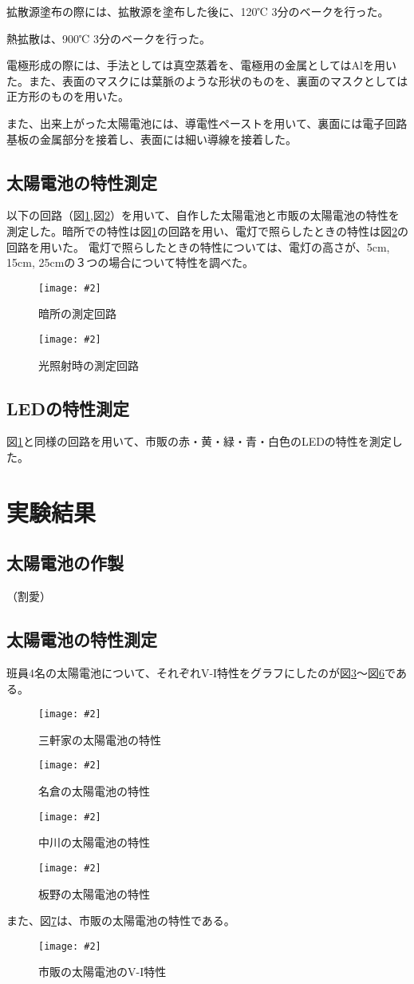 \documentclass[11pt]{ltjsarticle}
\newcommand{\fg}[3]{
	\begin{figure}
		\texttt{[image: \#2]}
		\caption{#3}
		\label{#1}
	\end{figure}
}
\newcommand{\fr}[1]{図\ref{#1}}
\begin{document}
		拡散源塗布の際には、拡散源を塗布した後に、120℃ 3分のベークを行った。
		
		熱拡散は、900℃ 3分のベークを行った。
		
		電極形成の際には、手法としては真空蒸着を、電極用の金属としてはAlを用いた。また、表面のマスクには葉脈のような形状のものを、裏面のマスクとしては正方形のものを用いた。

		また、出来上がった太陽電池には、導電性ペーストを用いて、裏面には電子回路基板の金属部分を接着し、表面には細い導線を接着した。

	\subsection{太陽電池の特性測定}
		以下の回路（\fr{fig2},\fr{fig3}）を用いて、自作した太陽電池と市販の太陽電池の特性を測定した。暗所での特性は\fr{fig2}の回路を用い、電灯で照らしたときの特性は\fr{fig3}の回路を用いた。
		電灯で照らしたときの特性については、電灯の高さが、5cm, 15cm, 25cmの３つの場合について特性を調べた。
		\fg{fig2}{resources/circuit/dark.png}{暗所の測定回路}
		\fg{fig3}{resources/circuit/light.png}{光照射時の測定回路}

	\subsection{LEDの特性測定}
		\fr{fig2}と同様の回路を用いて、市販の赤・黄・緑・青・白色のLEDの特性を測定した。

\section{実験結果}
	\subsection{太陽電池の作製}
		（割愛）
	\subsection{太陽電池の特性測定}
		\label{sec1}
		班員4名の太陽電池について、それぞれV-I特性をグラフにしたのが\fr{fig4}〜\fr{fig7}である。
		\fg{fig4}{resources/solar/base/sangenya.png}{三軒家の太陽電池の特性}
		\fg{fig5}{resources/solar/base/nagura.png}{名倉の太陽電池の特性}
		\fg{fig6}{resources/solar/base/nakagawa.png}{中川の太陽電池の特性}
		\fg{fig7}{resources/solar/base/itano.png}{板野の太陽電池の特性}

		また、\fr{fig12}は、市販の太陽電池の特性である。
		\fg{fig12}{resources/solar/kadai3/commerce.png}{市販の太陽電池のV-I特性}
\end{document}
